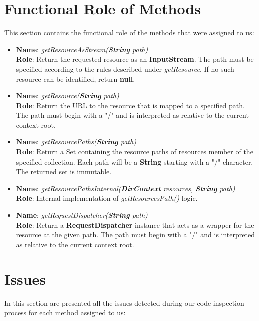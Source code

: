 \section{Functional Role of Methods}
This section contains the functional role of the methods that were assigned to us:
\begin{itemize}
	\item \textbf{Name}: \textit{getResourceAsStream(\textbf{String} path)}\\
		\textbf{Role}: Return the requested resource as an \textbf{InputStream}. The path must be specified according to the rules described under \textit{getResource}. If no such resource can be identified, return \textbf{null}.
	\item \textbf{Name}: \textit{getResource(\textbf{String} path)}\\
		\textbf{Role}: Return the URL to the resource that is mapped to a specified path. The path must begin with a "/" and is interpreted as relative to the current context root.
	\item \textbf{Name}: \textit{getResourcePaths(\textbf{String} path)}\\
		\textbf{Role}: Return a Set containing the resource paths of resources member of the specified collection. Each path will be a \textbf{String} starting with a "/" character. The returned set is immutable.
	\item \textbf{Name}: \textit{getResourcePathsInternal(\textbf{DirContext} resources, \textbf{String} path)}\\
		\textbf{Role}: Internal implementation of \textit{getResourcesPath()} logic.
	\item \textbf{Name}: \textit{getRequestDispatcher(\textbf{String} path)}\\
		\textbf{Role}: Return a \textbf{RequestDispatcher} instance that acts as a wrapper for the resource at the given path. The path must begin with a "/" and is interpreted as relative to the current context root.
\end{itemize}

\section{Issues}
In this section are presented all the issues detected during our code inspection process for each method assigned to us:
\clearpage

